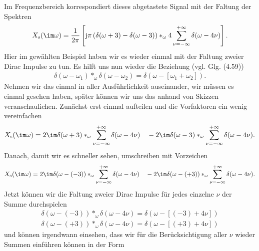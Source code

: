 \begin{ExCalc}
Im Frequenzbereich korrespondiert dieses abgetastete Signal mit der Faltung der Spektren
\begin{equation}
X_\mathrm{s}(\im\omega) = \frac{1}{2\pi}
\left[
\mathrm{j} \pi \left( \delta(\omega+3) - \delta(\omega-3) \right)
\ast_\omega 4 \sum_{\nu=-\infty}^{+\infty} \delta(\omega-4 \nu)
\right].
\end{equation}
%
Hier im gewählten Beispiel haben wir es wieder einmal mit der Faltung zweier
Dirac Impulse zu tun. Es hilft uns nun wieder die Beziehung (vgl. Glg. (4.59))
\begin{align}
\delta(\omega-\omega_1) \ast_\omega \delta(\omega-\omega_2)=
\delta(\omega-[\omega_1+\omega_2]).
\end{align}
Nehmen wir das einmal in aller Ausführlichkeit auseinander, wir müssen es einmal
gesehen haben, später können wir uns das anhand von Skizzen veranschaulichen.
Zunächst erst einmal aufteilen und die Vorfaktoren ein wenig vereinfachen
%
%
\begin{equation}
X_\mathrm{s}(\im\omega) = 2\im
\delta(\omega+3)
\ast_\omega \sum_{\nu=-\infty}^{+\infty} \delta(\omega-4 \nu)
\quad-
2\im
\delta(\omega-3)
\ast_\omega \sum_{\nu=-\infty}^{+\infty} \delta(\omega-4 \nu).
\end{equation}
Danach, damit wir es schneller sehen, umschreiben mit Vorzeichen
\begin{equation}
X_\mathrm{s}(\im\omega) = 2\im
\delta(\omega-(-3))
\ast_\omega \sum_{\nu=-\infty}^{+\infty} \delta(\omega-4 \nu)
\quad-
2\im
\delta(\omega-(+3))
\ast_\omega \sum_{\nu=-\infty}^{+\infty} \delta(\omega-4 \nu).
\end{equation}
Jetzt können wir die Faltung zweier Dirac Impulse für jedes einzelne $\nu$
der Summe durchspielen
\begin{align}
\delta(\omega-(-3)) \ast_\omega \delta(\omega-4 \nu) = \delta(\omega - [(-3)+4\nu])\\
\delta(\omega-(+3)) \ast_\omega \delta(\omega-4 \nu) = \delta(\omega - [(+3)+4\nu])
\end{align}
und können irgendwann einsehen, dass wir für die Berücksichtigung aller $\nu$
wieder Summen einführen können in der Form

\end{ExCalc}
